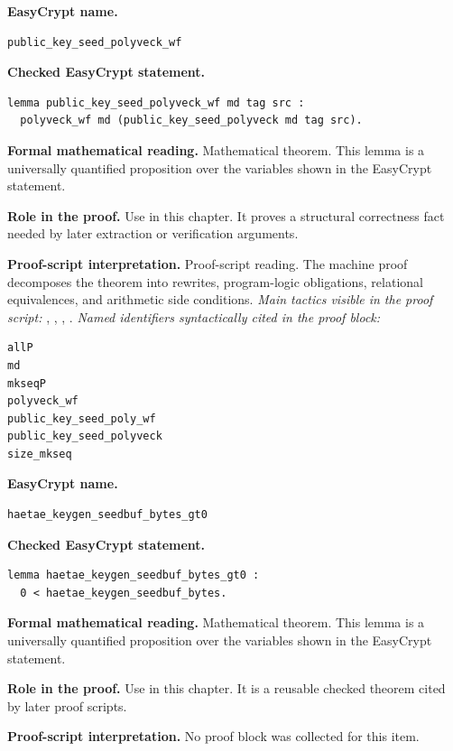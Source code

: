 \begin{formaltheorem}
\noindent\textbf{EasyCrypt name.}
\begin{lstlisting}[language=EasyCrypt,basicstyle=\ttfamily\scriptsize]
public_key_seed_polyveck_wf
\end{lstlisting}
\noindent\textbf{Checked EasyCrypt statement.}
\begin{lstlisting}[language=EasyCrypt,basicstyle=\ttfamily\scriptsize]
lemma public_key_seed_polyveck_wf md tag src :
  polyveck_wf md (public_key_seed_polyveck md tag src).
\end{lstlisting}
\noindent\textbf{Formal mathematical reading.}
Mathematical theorem. This lemma is a universally quantified proposition over the variables shown in the EasyCrypt statement.

\noindent\textbf{Role in the proof.}
Use in this chapter. It proves a structural correctness fact needed by later extraction or verification arguments.

\noindent\textbf{Proof-script interpretation.}
Proof-script reading. The machine proof decomposes the theorem into rewrites, program-logic obligations, relational equivalences, and arithmetic side conditions.
\emph{Main tactics visible in the proof script:} , , , .
\emph{Named identifiers syntactically cited in the proof block:}
\begin{lstlisting}[language=EasyCrypt,basicstyle=\ttfamily\scriptsize]
allP
md
mkseqP
polyveck_wf
public_key_seed_poly_wf
public_key_seed_polyveck
size_mkseq
\end{lstlisting}

\end{formaltheorem}

\begin{formaltheorem}
\noindent\textbf{EasyCrypt name.}
\begin{lstlisting}[language=EasyCrypt,basicstyle=\ttfamily\scriptsize]
haetae_keygen_seedbuf_bytes_gt0
\end{lstlisting}
\noindent\textbf{Checked EasyCrypt statement.}
\begin{lstlisting}[language=EasyCrypt,basicstyle=\ttfamily\scriptsize]
lemma haetae_keygen_seedbuf_bytes_gt0 :
  0 < haetae_keygen_seedbuf_bytes.
\end{lstlisting}
\noindent\textbf{Formal mathematical reading.}
Mathematical theorem. This lemma is a universally quantified proposition over the variables shown in the EasyCrypt statement.

\noindent\textbf{Role in the proof.}
Use in this chapter. It is a reusable checked theorem cited by later proof scripts.

\noindent\textbf{Proof-script interpretation.}
No proof block was collected for this item.

\end{formaltheorem}


